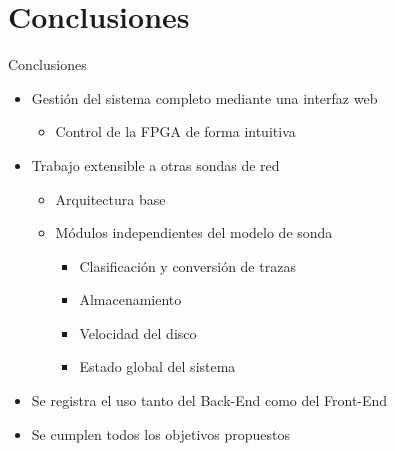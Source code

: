 \section{Conclusiones}

\begin{frame}{Conclusiones}
  \begin{itemize}
    \item Gestión del sistema completo mediante una interfaz web
    \begin{itemize}
      \item Control de la FPGA de forma intuitiva
    \end{itemize}
    \item Trabajo extensible a otras sondas de red
    \begin{itemize}
      \item Arquitectura base
      \item Módulos independientes del modelo de sonda
      \begin{itemize}
        \item Clasificación y conversión de trazas
        \item Almacenamiento
        \item Velocidad del disco
        \item Estado global del sistema
      \end{itemize}
    \end{itemize}
    \item Se registra el uso tanto del Back-End como del Front-End
    \item Se cumplen todos los objetivos propuestos
  \end{itemize}
\end{frame}

